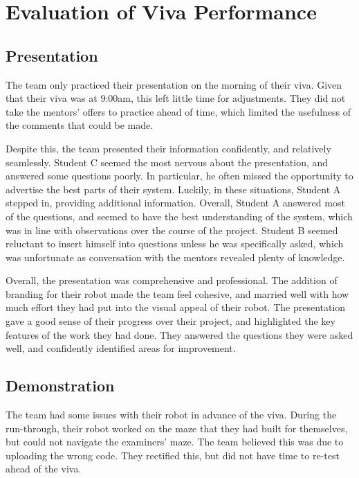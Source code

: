 


\section{Evaluation of Viva Performance}\label{sec:viva}
    \subsection{Presentation}\label{subsec:viva-presentation}
        The team only practiced their presentation on the morning of their viva.
        Given that their viva was at 9:00am, this left little time for adjustments.
        They did not take the mentors' offers to practice ahead of time, which limited the usefulness of the comments that could be made.

        Despite this, the team presented their information confidently, and relatively seamlessly.
        Student C seemed the most nervous about the presentation, and answered some questions poorly.
        In particular, he often missed the opportunity to advertise the best parts of their system.
        Luckily, in these situations, Student A stepped in, providing additional information.
        Overall, Student A answered most of the questions, and seemed to have the best understanding of the system, which was in line with observations over the course of the project.
        Student B seemed reluctant to insert himself into questions unless he was specifically asked, which was unfortunate as conversation with the mentors revealed plenty of knowledge.

        Overall, the presentation was comprehensive and professional.
        The addition of branding for their robot made the team feel cohesive, and married well with how much effort they had put into the visual appeal of their robot.
        The presentation gave a good sense of their progress over their project, and highlighted the key features of the work they had done.
        They answered the questions they were asked well, and confidently identified areas for improvement.

    \subsection{Demonstration}\label{subsec:viva-demonstration}
        The team had some issues with their robot in advance of the viva.
        During the run-through, their robot worked on the maze that they had built for themselves, but could not navigate the examiners' maze.
        The team believed this was due to uploading the wrong code.
        They rectified this, but did not have time to re-test ahead of the viva.

